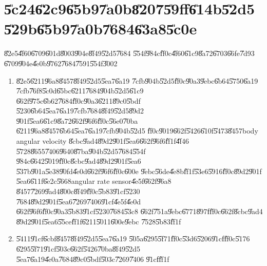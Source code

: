 \documentclass[12pt,a4paper]{article}
\begin{document}
%

\part{\U{5c24}\U{62c9}\U{65b9}\U{7a0b}\U{8207}\U{59ff}\U{614b}\U{52d5}%
\U{529b}\U{65b9}\U{7a0b}\U{7684}\U{63a8}\U{5c0e}}

\setcounter{page}{1}\bigskip

\U{82e5}\U{4f60}\U{6709}\U{601d}\U{8003}\U{904e}\U{8f49}\U{52d5}\U{7684}%
\U{554f}\U{984c}\U{ff0c}\U{4f60}\U{61c9}\U{8a72}\U{6703}\U{66fe}\U{7d93}%
\U{6709}\U{904e}\U{4e0b}\U{9762}\U{7684}\U{7591}\U{554f}\U{3002}

\begin{enumerate}
\item \U{82e5}\U{6211}\U{96a8}\U{8457}\U{8f49}\U{52d5}\U{5ea7}\U{6a19}%
\U{7cfb}\U{904b}\U{52d5}\U{ff0c}\U{90a3}\U{9ebc}\U{6b64}\U{5750}\U{6a19}%
\U{7cfb}\U{76f8}\U{5c0d}\U{65bc}\U{6211}\U{7684}\U{904b}\U{52d5}\U{61c9}%
\U{662f}\U{975c}\U{6b62}\U{7684}\U{ff0c}\U{90a3}\U{6211}\U{89c0}\U{5bdf}%
\U{5230}\U{6b64}\U{5ea7}\U{6a19}\U{7cfb}\U{7684}\U{8f49}\U{52d5}\U{89d2}%
\U{901f}\U{5ea6}\U{61c9}\U{8a72}\U{662f}\U{96f6}\U{ff0c}\U{56e0}\U{70ba}%
\U{6211}\U{96a8}\U{8457}\U{6b64}\U{5ea7}\U{6a19}\U{7cfb}\U{904b}\U{52d5}%
\U{ff0c}\U{9019}\U{662f}\U{5426}\U{610f}\U{5473}\U{8457}body angular velocity%
\U{8cbc}\U{9ad4}\U{89d2}\U{901f}\U{5ea6}\U{662f}\U{96f6}\U{ff1f}\U{4f46}%
\U{5728}\U{8655}\U{7406}\U{9640}\U{87ba}\U{904b}\U{52d5}\U{7684}\U{554f}%
\U{984c}\U{6642}\U{5019}\U{ff0c}\U{8cbc}\U{9ad4}\U{89d2}\U{901f}\U{5ea6}%
\U{537b}\U{901a}\U{5e38}\U{90fd}\U{4e0d}\U{662f}\U{96f6}\U{ff0c}\U{600e}%
\U{9ebc}\U{56de}\U{4e8b}\U{ff1f}\U{53e6}\U{5916}\U{ff0c}\U{89d2}\U{901f}%
\U{5ea6}\U{611f}\U{6e2c}\U{5668}angular rate sensor\U{4e5f}\U{662f}\U{96a8}%
\U{8457}\U{7269}\U{9ad4}\U{800c}\U{8f49}\U{ff0c}\U{5b83}\U{91cf}\U{5230}%
\U{7684}\U{89d2}\U{901f}\U{5ea6}\U{7269}\U{7406}\U{91cf}\U{4e5f}\U{4e0d}%
\U{662f}\U{96f6}\U{ff0c}\U{90a3}\U{5b83}\U{91cf}\U{5230}\U{7684}\U{53c8}%
\U{662f}\U{751a}\U{9ebc}\U{6771}\U{897f}\U{ff0c}\U{662f}\U{8cbc}\U{9ad4}%
\U{89d2}\U{901f}\U{5ea6}\U{55ce}\U{ff1f}\U{6211}\U{5011}\U{600e}\U{9ebc}%
\U{7528}\U{5b83}\U{ff1f}

\item \U{5411}\U{91cf}\U{6cbf}\U{8457}\U{8f49}\U{52d5}\U{5ea7}\U{6a19}%
\U{505a}\U{6295}\U{5f71}\U{ff0c}\U{53d6}\U{5206}\U{91cf}\U{ff0c}\U{5176}%
\U{6295}\U{5f71}\U{91cf}\U{503c}\U{662f}\U{5426}\U{70ba}\U{8f49}\U{52d5}%
\U{5ea7}\U{6a19}\U{4e0a}\U{7684}\U{89c0}\U{5bdf}\U{503c}\U{7269}\U{7406}%
\U{91cf}\U{ff1f}


\end{enumerate}
\end{document}
